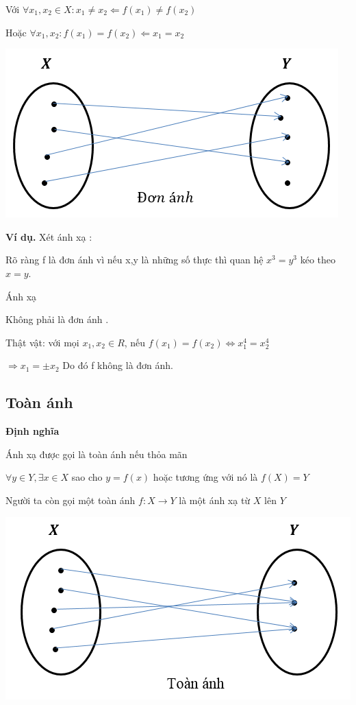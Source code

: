 \documentclass[12pt,oneside,a4paper,reqno]{book}
\begin{document}
Với $\forall x_1,x_2\in X: x_1\neq x_2\Leftarrow f(x_1)\neq f(x_2)$

Hoặc $\forall x_1,x_2:f(x_1 )=f(x_2 )\Leftarrow x_1=x_2$

\includegraphics{hinh4}

\textbf{Ví dụ.}
Xét ánh xạ :


Rõ ràng f là đơn ánh vì nếu x,y là những số thực thì quan hệ $x^3=y^3$ kéo theo $x=y$.

Ánh xạ 

Không phải là đơn ánh .

Thật vật:  với mọi $x_1,x_2\in R$, nếu $f(x_1 )=f(x_2) \Leftrightarrow  x_1^4=x_2^4$

$\Rightarrow x_1=\pm x_2 $
Do đó f không là đơn ánh.

\subsection{Toàn ánh}
\textbf{Định nghĩa}

Ánh xạ  được gọi là toàn ánh nếu thỏa mãn
          
$\forall y\in Y,\exists x\in X$ sao cho $y=f(x)$  hoặc tương ứng với nó là $f(X)=Y$

Người ta còn gọi một toàn ánh $f:X\to Y$ là một ánh xạ từ $X$ lên $Y$

\includegraphics{hinh5}
\end{document}
